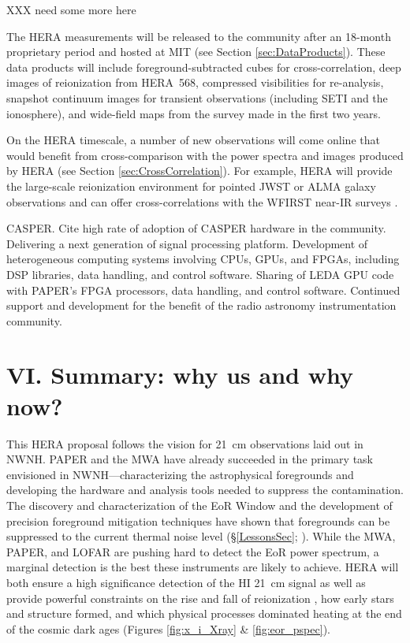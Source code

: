 \documentclass[preprint]{aastex}
\def\HI{{H{\small I }}}
\begin{document}
XXX need some more here

The HERA measurements will be released to the community after an 18-month proprietary period and hosted at MIT (see Section \ref{sec:DataProducts}).  These data products will include foreground-subtracted cubes for
cross-correlation, deep images of reionization from HERA~568, compressed visibilities for re-analysis, snapshot continuum images for transient observations (including SETI and the ionosphere), and wide-field maps from the survey made in the first two years.

On the HERA timescale, a number of new observations will come online that would benefit from cross-comparison with the power spectra and images produced by HERA (see Section \ref{sec:CrossCorrelation}). For example, HERA will provide the large-scale reionization environment for pointed JWST or ALMA galaxy observations and can offer cross-correlations with  the WFIRST near-IR surveys \citep{lidz_et_al2009}.
 
CASPER.
Cite high rate of adoption of CASPER hardware in the community.
Delivering a next generation of signal processing platform.
Development of heterogeneous computing systems involving CPUs, GPUs, and FPGAs, including DSP libraries, data handling, and control software.
Sharing of LEDA GPU code \citep{clark_et_al2011} with PAPER's FPGA processors, data handling, and control software.
Continued support and development for the benefit of the radio astronomy instrumentation community.




\section{VI. Summary: why us and why now?} %

This HERA proposal follows the vision for 21~cm observations laid out in NWNH.
PAPER and the MWA have already succeeded in the primary task envisioned in
NWNH---characterizing the astrophysical foregrounds and developing the hardware
and analysis 
tools needed to suppress the contamination. The discovery and
characterization of the EoR Window and the development of precision foreground
mitigation techniques have shown that foregrounds can be suppressed to the current
thermal noise level (\S \ref{LessonsSec}; \citealt{parsons_et_al2013}). While the MWA,
PAPER, and LOFAR are pushing hard to detect the EoR power spectrum, %
a marginal detection is the best these instruments are likely to achieve.
HERA will both ensure a high significance detection of the \HI 21~cm 
signal as
well as provide powerful constraints on the rise and fall of reionization \citep{pober_et_al2014}, how
early stars and structure formed, and which physical processes dominated heating at the end of the
cosmic dark ages (Figures \ref{fig:x_i_Xray} \& \ref{fig:eor_pspec}).
\end{document}
